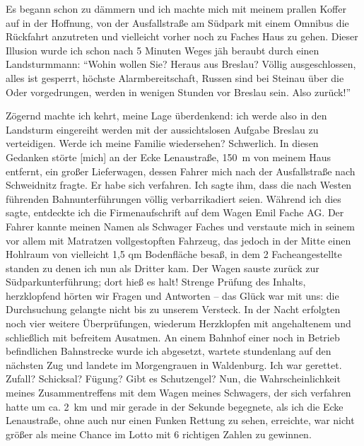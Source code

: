 \documentclass[a5paper,pagesize,10pt,twoside=true]{scrbook}
\renewcommand{\marginpar}[2][]{}
\begin{document}
Es begann schon zu dämmern und ich machte mich mit meinem prallen Koffer auf in der Hoffnung, von der Ausfallstraße am Südpark mit einem Omnibus die Rückfahrt anzutreten und vielleicht vorher noch zu Faches Haus zu gehen. Dieser Illusion wurde ich schon nach 5 Minuten Weges jäh beraubt durch einen Landsturmmann: \enquote{Wohin wollen Sie? Heraus aus Breslau? Völlig ausgeschlossen, alles ist gesperrt, höchste Alarmbereitschaft, Russen sind bei Steinau über die Oder vorgedrungen, werden in wenigen Stunden vor Breslau sein. Also zurück!}

\marginpar{58} Zögernd machte ich kehrt, meine Lage überdenkend: ich werde also in den Landsturm eingereiht werden mit der aussichtslosen Aufgabe Breslau zu verteidigen. Werde ich meine Familie wiedersehen? Schwerlich. In diesen Gedanken störte [mich] an der Ecke Lenaustraße, 150~m von meinem Haus entfernt, ein großer Lieferwagen, dessen Fahrer mich nach der Ausfallstraße nach Schweidnitz fragte. Er habe sich verfahren. Ich sagte ihm, dass die nach Westen führenden Bahnunterführungen völlig verbarrikadiert seien. Während ich dies sagte, entdeckte ich die Firmenaufschrift auf dem Wagen Emil Fache AG. Der Fahrer kannte meinen Namen als Schwager Faches und verstaute mich in seinem vor allem mit Matratzen vollgestopften Fahrzeug, das jedoch in der Mitte einen Hohlraum von vielleicht 1,5 qm Bodenfläche besaß, in dem 2 Facheangestellte standen zu denen ich nun als Dritter kam. Der Wagen sauste zurück zur Südparkunterführung; dort hieß es halt! Strenge Prüfung des Inhalts, herzklopfend hörten wir Fragen und Antworten -- das Glück war mit uns: die Durchsuchung gelangte \marginpar{59} nicht bis zu unserem Versteck. In der Nacht erfolgten noch vier weitere Überprüfungen, wiederum Herzklopfen mit angehaltenem und schließlich mit befreitem Ausatmen. An einem Bahnhof einer noch in Betrieb befindlichen Bahnstrecke wurde ich abgesetzt, wartete stundenlang auf den nächsten Zug und landete im Morgengrauen in Waldenburg. Ich war gerettet. Zufall? Schicksal? Fügung? Gibt es Schutzengel? Nun, die Wahrscheinlichkeit meines Zusammentreffens mit dem Wagen meines Schwagers, der sich verfahren hatte um ca. 2~km und mir gerade in der Sekunde begegnete, als ich die Ecke Lenaustraße, ohne auch nur einen Funken Rettung zu sehen, erreichte, war nicht größer als meine Chance im Lotto mit 6 richtigen Zahlen zu gewinnen.
\end{document}
